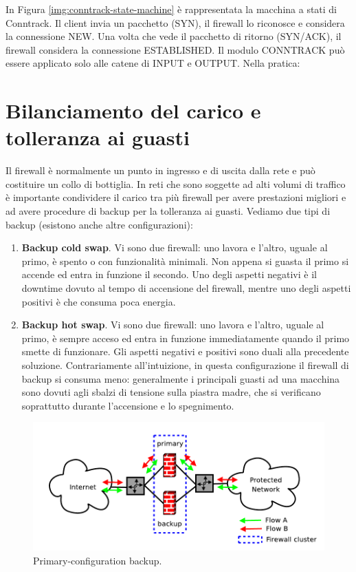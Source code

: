 \begin{enumerate}
In Figura \ref{img:conntrack-state-machine} è rappresentata la macchina a stati di Conntrack. Il client invia un pacchetto (SYN), il firewall lo riconosce e considera la connessione NEW. Una volta che vede il pacchetto di ritorno (SYN/ACK), il firewall considera la connessione ESTABLISHED. Il modulo CONNTRACK può essere applicato solo alle catene di INPUT e OUTPUT. Nella pratica:
\end{enumerate}

\section{Bilanciamento del carico e tolleranza ai guasti}
Il firewall è normalmente un punto in ingresso e di uscita dalla rete e può costituire un collo di bottiglia. In reti che sono soggette ad alti volumi di traffico è importante condividere il carico tra più firewall per avere prestazioni migliori e ad avere procedure di backup per la tolleranza ai guasti. Vediamo due tipi di backup (esistono anche altre configurazioni):
\begin{enumerate}
	\item \textbf{Backup cold swap}. Vi sono due firewall: uno lavora e l'altro, uguale al primo, è spento o con funzionalità minimali. Non appena si guasta il primo si accende ed entra in funzione il secondo. Uno degli aspetti negativi è il downtime dovuto al tempo di accensione del firewall, mentre uno degli aspetti positivi è che consuma poca energia.
	\item \textbf{Backup hot swap}. Vi sono due firewall: uno lavora e l'altro, uguale al primo, è sempre acceso ed entra in funzione immediatamente quando il primo smette di funzionare. Gli aspetti negativi e positivi sono duali alla precedente soluzione. Contrariamente all'intuizione, in questa configurazione il firewall di backup si consuma meno: generalmente i principali guasti ad una macchina sono dovuti agli sbalzi di tensione sulla piastra madre, che si verificano soprattutto durante l'accensione e lo spegnimento.
\end{enumerate}
\begin{figure}[htbp]
	\centering
	\includegraphics[scale = 0.35]{images/primary-configuration-backup}
	\caption{Primary-configuration backup.}
	\label{img:primary-configuration-backup}
\end{figure}
